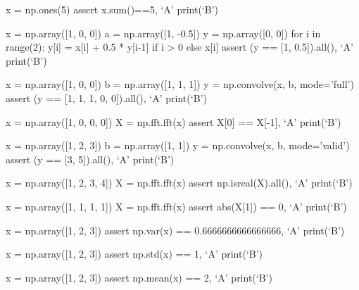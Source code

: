 \documentclass[12pt]{exam}
\begin{document}
\begin{questions}
\begin{python}
x = np.ones(5)
assert x.sum()==5, `A'
print(`B')
\end{python}

\begin{python}
x = np.array([1, 0, 0])
a = np.array([1, -0.5])
y = np.array([0, 0])
for i in range(2):
    y[i] = x[i] + 0.5 * y[i-1] if i > 0 else x[i]
assert (y == [1, 0.5]).all(), `A'
print(`B')
\end{python}

\begin{python}
x = np.array([1, 0, 0])
b = np.array([1, 1, 1])
y = np.convolve(x, b, mode='full')
assert (y == [1, 1, 1, 0, 0]).all(), `A'
print(`B')
\end{python}

\begin{python}
x = np.array([1, 0, 0, 0])
X = np.fft.fft(x)
assert X[0] == X[-1], `A'
print(`B')
\end{python}

\begin{python}
x = np.array([1, 2, 3])
b = np.array([1, 1])
y = np.convolve(x, b, mode='valid')
assert (y == [3, 5]).all(), `A'
print(`B')
\end{python}

\begin{python}
x = np.array([1, 2, 3, 4])
X = np.fft.fft(x)
assert np.isreal(X).all(), `A'
print(`B')
\end{python}

\begin{python}
x = np.array([1, 1, 1, 1])
X = np.fft.fft(x)
assert abs(X[1]) == 0, `A'
print(`B')
\end{python}

\begin{python}
x = np.array([1, 2, 3])
assert np.var(x) == 0.6666666666666666, `A'
print(`B')
\end{python}

\begin{python}
x = np.array([1, 2, 3])
assert np.std(x) == 1, `A'
print(`B')
\end{python}

\begin{python}
x = np.array([1, 2, 3])
assert np.mean(x) == 2, `A'
print(`B')
\end{python}

\end{questions}
\end{document}
